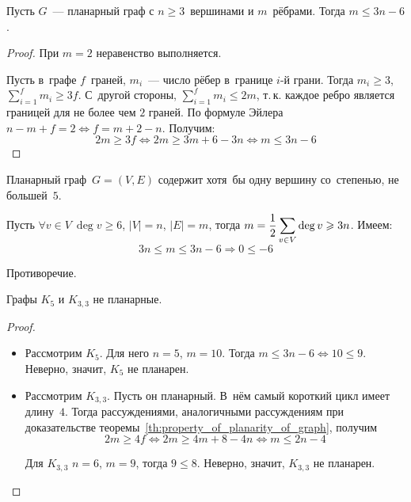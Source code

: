 \begin{theorem}
\label{th:property_of_planarity_of_graph}
Пусть $G$~--- планарный граф с $n \geqslant 3$~вершинами и $m$~рёбрами. Тогда $m \leqslant 3n - 6$.
\end{theorem}
\begin{proof}
При $m = 2$ неравенство выполняется.

Пусть в~графе $f$~граней, $m_i$~--- число рёбер в~границе $i$-й грани.
Тогда $m_i \geqslant 3$, $\displaystyle \sum_{i=1}^f m_i \geqslant 3f$.
С~другой стороны, $\displaystyle \sum_{i=1}^f m_i \leqslant 2m$, т.\,к. каждое ребро является границей для не более чем $2$ граней.
По формуле Эйлера $n - m + f = 2 \Leftrightarrow f = m + 2 - n$.
Получим:
\begin{equation*}
2m \geqslant 3f \Leftrightarrow 2m \geqslant 3m + 6 - 3n \Leftrightarrow m \leqslant 3n - 6
\end{equation*}
\end{proof}

\begin{consequent}
Планарный граф~$G = (V, E)$ содержит хотя~бы одну вершину со~степенью, не большей~$5$.
\end{consequent}
\begin{proofcontra}
Пусть $\forall v \in V \ \deg v \geqslant 6$, $|V| = n$, $|E| = m$, тогда
$\displaystyle m \opbr= \frac12 \sum_{v \in V} \deg v \opbr\geqslant 3n$.
Имеем:
\begin{equation*}
3n \leqslant m \leqslant 3n - 6 \Rightarrow 0 \leqslant -6
\end{equation*}

Противоречие.
\end{proofcontra}

\begin{theorem}
Графы $K_5$ и $K_{3,3}$ не планарные.
\end{theorem}
\begin{proof}
\begin{itemize}
	\item Рассмотрим $K_5$.
	Для него $n = 5$, $m = 10$.
	Тогда $m \leqslant 3n - 6 \Leftrightarrow 10 \leqslant 9$.	
	Неверно, значит, $K_5$ не планарен.
	\item Рассмотрим $K_{3,3}$.
	Пусть он планарный.
	В~нём самый короткий цикл имеет длину~$4$.
	Тогда рассуждениями, аналогичными рассуждениям при доказательстве теоремы~\ref*{th:property_of_planarity_of_graph}, получим
	\begin{equation*}
	2m \geqslant 4f \Leftrightarrow 2m \geqslant 4m + 8 - 4n \Leftrightarrow m \leqslant 2n - 4
	\end{equation*}
	
	Для $K_{3,3}$ $n = 6$, $m = 9$, тогда $9 \leqslant 8$.
	Неверно, значит, $K_{3,3}$ не планарен.
\end{itemize}
\end{proof}

